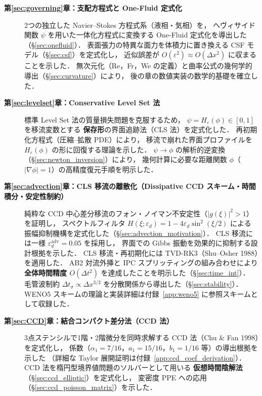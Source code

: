 \begin{description}
  \item[\textbf{第\ref{sec:governing}章：支配方程式と One-Fluid 定式化}]
        2つの独立した Navier--Stokes 方程式系（液相・気相）を，
        ヘヴィサイド関数 $\psi$ を用いた一体化方程式に変換する
        One-Fluid 定式化を導出した（§\ref{sec:onefluid}）．
        表面張力の特異な面力を体積力に置き換える
        CSF モデル（§\ref{sec:csf}）を定式化し，
        近似誤差が $O(\varepsilon^2) \approx O(\Delta x^2)$ に収まることを示した．
        無次元化（Re，Fr，We の定義）と曲率公式の幾何学的導出（§\ref{sec:curvature}）により，
        後の章の数値実装の数学的基礎を確立した．

  \item[\textbf{第\ref{sec:levelset}章：Conservative Level Set 法}]
        標準 Level Set 法の質量損失問題を克服するため，
        $\psi = H_\varepsilon(\phi) \in [0,1]$ を移流変数とする
        \textbf{保存形}の界面追跡法（CLS 法）を定式化した．
        再初期化方程式（圧縮--拡散 PDE）により，
        移流で崩れた界面プロファイルを $H_\varepsilon(\phi)$ の形に回復する理論を示した．
        $\psi \to \phi$ の解析的逆変換（§\ref{sec:newton_inversion}）により，
        幾何計算に必要な距離関数 $\phi$（$|\nabla\phi|=1$）の高精度復元手順を明示した．

  \item[\textbf{第\ref{sec:advection}章：CLS 移流の離散化（Dissipative CCD スキーム・時間積分・安定性制約）}]
        純粋な CCD 中心差分移流のフォン・ノイマン不安定性（$|g(\xi)|^2 > 1$）を証明し，
        スペクトルフィルタ $H(\xi;\varepsilon_d) = 1 - 4\varepsilon_d\sin^2(\xi/2)$ による
        振幅抑制機構を定式化した（§\ref{sec:advection_motivation}）．
        CLS 移流には一様 $\varepsilon_d^{\text{adv}} = 0.05$ を採用し，
        界面での Gibbs 振動を効果的に抑制する設計根拠を示した．
        CLS 移流・再初期化には TVD-RK3（Shu--Osher 1988）を適用した．
        AB2 対流外挿と IPC スプリッティングの組み合わせにより
        \textbf{全体時間精度 $O(\Delta t^2)$} を達成したことを明示した（§\ref{sec:time_int}）．
        毛管波制約 $\Delta t_\sigma \propto \Delta x^{3/2}$ を分散関係から導出した（§\ref{sec:stability}）．
        WENO5 スキームの理論と実装詳細は付録~\ref{app:weno5} に参照スキームとして収録した．

  \item[\textbf{第\ref{sec:CCD}章：結合コンパクト差分法（CCD 法）}]
        3点ステンシルで1階・2階微分を同時求解する CCD 法（Chu \& Fan 1998）を定式化し，
        係数（$\alpha_1 = 7/16$，$a_1 = 15/16$，$b_1 = 1/16$ 等）の導出根拠を示した
        （詳細な Taylor 展開証明は付録~\ref{app:ccd_coef_derivation}）．
        CCD 法を楕円型境界値問題のソルバーとして用いる
        \textbf{仮想時間陰解法}（§\ref{sec:ccd_elliptic}）を定式化し，
        変密度 PPE への応用（§\ref{sec:ccd_poisson_matrix}）を示した．


\end{description}

